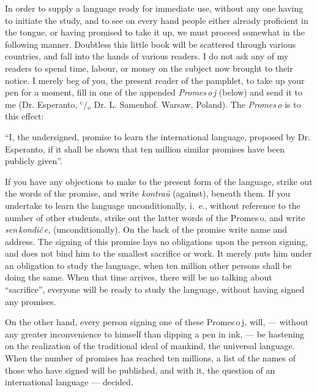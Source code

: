 In order to supply a language ready for immediate use, without any one having to initiate the study, and to see on every hand people either already proficient in the tongue, or having promised to take it up, we must proceed somewhat in the following manner. Doubtless this little book will be scattered through various countries, and fall into the hands of various readers. I do not ask any of my readers to spend time, labour, or money on the subject now brought to their notice. I merely beg of you, the present reader of the pamphlet, to take up your pen for a moment, fill in one of the appended \emph{\glqq Promes\,o\,j\grqq} (below) and send it to me (Dr. Esperanto, $\mathrm{^c\!/\!_o}$ Dr. L. Samenhof. Warsaw, Poland). The \emph{\glqq Promes\,o\grqq} is to this effect:

\begin{adjustwidth}{1cm}{1cm}
\hspace{1.5em} “I, the undersigned, promise to learn the international language, proposed by Dr. Es\-per\-anto, if it shall be shown that ten million similar promises have been publicly given”.
\end{adjustwidth}

If you have any objections to make to the present form of the language, strike out the words of the promise, and write \emph{\glqq kontraŭ\grqq} (against), beneath them. If you undertake to learn the language unconditionally, i.~e., without reference to the number of other students, strike out the latter words of the \glqq Promes\,o\grqq, and write \emph{\glqq{}sen\,kondiĉ\,e\grqq{}}, (unconditionally). On the back of the promise write name and address. The signing of this promise lays no obligations upon the person signing, and does not bind him to the smallest sacrifice or work. It merely puts him under an obligation to study the language, when ten million other persons shall be doing the same. When that time arrives, there will be no talking about ``sacrifice'', everyone will be ready to study the language, without having signed any promises.

On the other hand, every person signing one of these \glqq{}Promes\,o\,j\grqq{}, will, --- without any greater inconvenience to himself than dipping a pen in ink, --- be hastening on the realization of the traditional ideal of mankind, the universal language. When the number of promises has reached ten millions, a list of the names of those who have signed will be published, and with it, the question of an international language --- decided.

